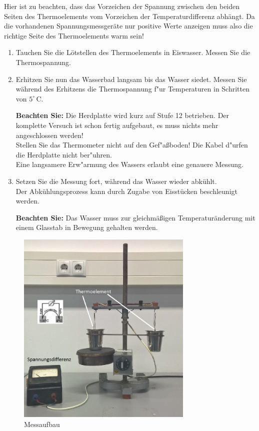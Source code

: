 \begin{tutorhint}
	Hier ist zu beachten, dass das Vorzeichen der Spannung zwischen den beiden Seiten des Thermoelements vom Vorzeichen der Temperaturdifferenz abhängt. Da die vorhandenen Spannungsmessgeräte nur positive Werte anzeigen muss also die richtige Seite des Thermoelements warm sein!
\end{tutorhint}

\begin{enumerate}
 \item Tauchen Sie die Lötstellen des Thermoelements in Eiswasser. Messen Sie die Thermospannung.
 \item Erhitzen Sie nun das Wasserbad langsam bis das Wasser siedet. Messen Sie während des Erhitzens die Thermospannung f"ur Temperaturen in Schritten von $5^{\circ}$\,C.
 
 \noindent
 \textbf{Beachten Sie:} Die Herdplatte wird kurz auf Stufe 12 betrieben. Der komplette Versuch ist schon fertig aufgebaut, es muss nichts mehr angeschlossen werden!\\
 Stellen Sie das Thermometer nicht auf den Gef"a{\ss}boden! Die Kabel d"urfen die Herdplatte nicht ber"uhren.\\
 Eine langsamere Erw"armung des Wassers erlaubt eine genauere Messung.
 \item Setzen Sie die Messung fort, während das Wasser wieder abkühlt. \\
 Der Abkühlungsprozess kann durch Zugabe von Eisstücken beschleunigt werden.
 
 \noindent
 \textbf{Beachten Sie:} Das Wasser muss zur gleichmäßigen Temperaturänderung mit einem Glasstab in Bewegung gehalten werden.
\end{enumerate}
\begin{figure}[h!]
	\centering
		\includegraphics[width=0.75\textwidth]{Abbildungen/Thermoelement_Aufbau2.JPG}
	\caption{Messaufbau}
	\label{fig:Messung}
\end{figure}
